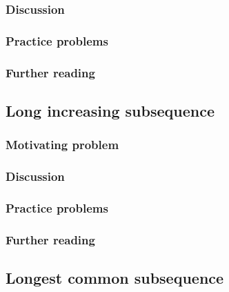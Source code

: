 
\subsubsection*{Discussion}

\subsubsection*{Practice problems}

\subsubsection*{Further reading}

\subsection{Long increasing subsequence}

\subsubsection*{Motivating problem}







\subsubsection*{Discussion}

\subsubsection*{Practice problems}

\subsubsection*{Further reading}

\subsection{Longest common subsequence}

